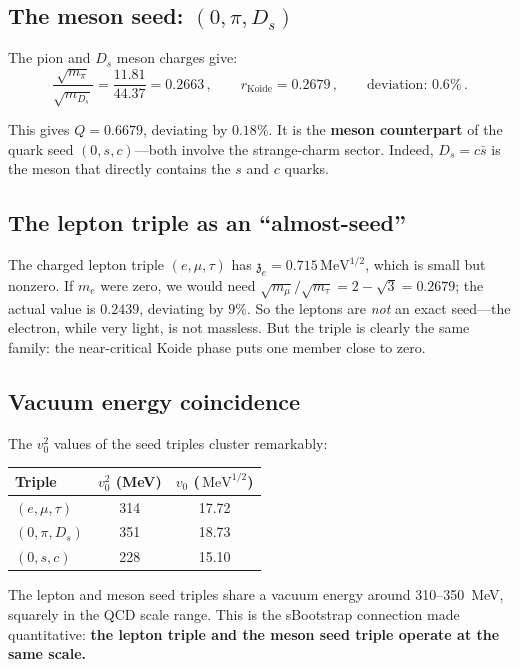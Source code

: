 \documentclass[12pt,a4paper]{article}
\newcommand{\MeV}{\,\text{MeV}}
\newcommand{\zch}{\mathfrak{z}}
\begin{document}
\subsection{The meson seed: $(0, \pi, D_s)$}

The pion and $D_s$ meson charges give:
\begin{equation}
\frac{\sqrt{m_\pi}}{\sqrt{m_{D_s}}} = \frac{11.81}{44.37} = 0.2663\,, 
\qquad r_{\text{Koide}} = 0.2679\,, \qquad \text{deviation: } 0.6\%\,.
\end{equation}

This gives $Q = 0.6679$, deviating by $0.18\%$. It is the 
\textbf{meson counterpart} of the quark seed $(0, s, c)$---both 
involve the strange-charm sector. Indeed, $D_s = c\bar{s}$ is the 
meson that directly contains the $s$ and $c$ quarks.

\subsection{The lepton triple as an ``almost-seed''}

The charged lepton triple $(e, \mu, \tau)$ has $\zch_e = 0.715\MeV^{1/2}$, 
which is small but nonzero. If $m_e$ were zero, we would need 
$\sqrt{m_\mu}/\sqrt{m_\tau} = 2 - \sqrt{3} = 0.2679$; the actual value 
is $0.2439$, deviating by $9\%$. So the leptons are \emph{not} an 
exact seed---the electron, while very light, is not massless. But the 
triple is clearly the same family: the near-critical Koide phase puts 
one member close to zero.

\subsection{Vacuum energy coincidence}

The $v_0^2$ values of the seed triples cluster remarkably:

\begin{center}
\begin{tabular}{lcc}
\toprule
Triple & $v_0^2$ (MeV) & $v_0$ ($\MeV^{1/2}$) \\
\midrule
$(e, \mu, \tau)$ & 314 & 17.72 \\
$(0, \pi, D_s)$ & 351 & 18.73 \\
$(0, s, c)$ & 228 & 15.10 \\
\bottomrule
\end{tabular}
\end{center}

The lepton and meson seed triples share a vacuum energy around 
310--350~MeV, squarely in the QCD scale range. This is the 
sBootstrap connection made quantitative: \textbf{the lepton triple 
and the meson seed triple operate at the same scale.}
\end{document}
